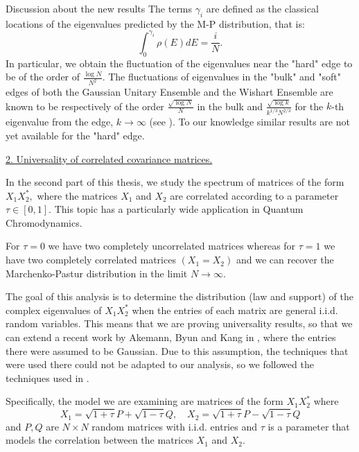\documentclass[11pt, a4paper, oneside]{book}
\numberwithin{equation}{chapter}
\begin{document}
\begin{section}{Discussion about the new results}
The terms $\gamma_i$ are defined as the classical locations of the eigenvalues predicted by the M-P distribution, that is:
%
$$ \int_0^{\gamma_i} \rho(E) dE = \frac{i}{N} .$$
%
In particular, we obtain the fluctuation of the eigenvalues near the "hard" edge to be of the order of $\frac{\log N}{N^2}$. The fluctuations of eigenvalues in the "bulk" and "soft" edges of both the Gaussian Unitary Ensemble and the Wishart Ensemble are known to be respectively of the order $\frac{\sqrt{\log N}}{N}$ in the bulk and $\frac{\sqrt{\log k}}{k^{1/3}N^{2/3}}$ for the $k$-th eigenvalue from the edge, $k \rightarrow \infty$ (see \cite{gustavsson2005gaussian, su2006gaussian}). To our knowledge similar results are not yet available for the "hard" edge.

\underline{2. Universality of correlated covariance matrices.}

In the second part of this thesis, we study the spectrum of  matrices of the form $X_{1}X_{2}^*,$ where the matrices $X_{1}$ and $X_{2}$ are correlated according to a parameter $\tau \in [0,1].$ This topic has a particularly wide application in Quantum Chromodynamics.

For $\tau=0$ we have two completely uncorrelated matrices whereas for $\tau=1$ we have two completely correlated matrices $(X_1=X_2)$ and we can recover the Marchenko-Pastur distribution in the limit $N \to \infty$.

The goal of this analysis is to determine the distribution (law and support) of the complex eigenvalues of $X_1X_2^*$ when the entries of each matrix are general i.i.d. random variables. This means that we are proving universality results, so that we can extend a recent work by Akemann, Byun and Kang in \cite{akemann2021non}, where the entries there were assumed to be Gaussian. Due to this assumption, the techniques that were used there could not be adapted to our analysis, so we followed the techniques used in \cite{alt2022local}.

Specifically, the model we are examining are matrices of the form $X_1X_2^*$ where
%
$$ X_1 = \sqrt{1+\tau} P + \sqrt{1-\tau}Q, \quad X_2 = \sqrt{1+\tau} P - \sqrt{1-\tau} Q $$
%
and $P,Q$ are $N \times N $ random matrices with i.i.d. entries and $\tau$ is a parameter that models the correlation between the matrices $X_1$ and $X_2$.


\end{section}
\end{document}
